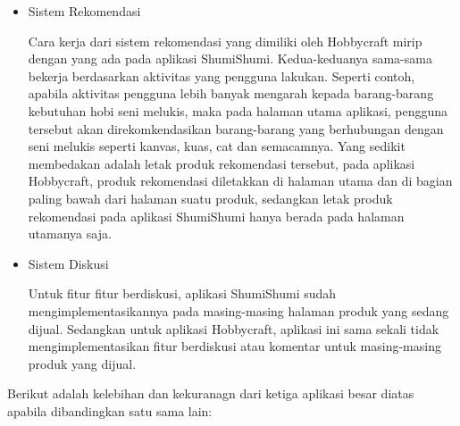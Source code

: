 \documentclass[a4paper]{article}
\begin{document}
\begin{itemize}
\begin{enumerate}
        \begin{itemize}
            \item Sistem Rekomendasi
            
            Cara kerja dari sistem rekomendasi yang dimiliki oleh Hobbycraft mirip dengan yang ada pada aplikasi ShumiShumi. Kedua-keduanya sama-sama bekerja berdasarkan aktivitas yang pengguna lakukan. Seperti contoh, apabila aktivitas pengguna lebih banyak mengarah kepada barang-barang kebutuhan hobi seni melukis, maka pada halaman utama aplikasi, pengguna tersebut akan direkomkendasikan barang-barang yang berhubungan dengan seni melukis seperti kanvas, kuas, cat dan semacamnya. Yang sedikit membedakan adalah letak produk rekomendasi tersebut, pada aplikasi Hobbycraft, produk rekomendasi diletakkan di halaman utama dan di bagian paling bawah dari halaman suatu produk, sedangkan letak produk rekomendasi pada aplikasi ShumiShumi hanya berada pada halaman utamanya saja.

            \item Sistem Diskusi
            
            Untuk fitur fitur berdiskusi, aplikasi ShumiShumi sudah mengimplementasikannya pada masing-masing halaman produk yang sedang dijual. Sedangkan untuk aplikasi Hobbycraft, aplikasi ini sama sekali tidak mengimplementasikan fitur berdiskusi atau komentar untuk masing-masing produk yang dijual.

        \end{itemize}

    \end{enumerate}

    Berikut adalah kelebihan dan kekuranagn dari ketiga aplikasi besar diatas apabila dibandingkan satu sama lain: 


\end{itemize}
\end{document}
